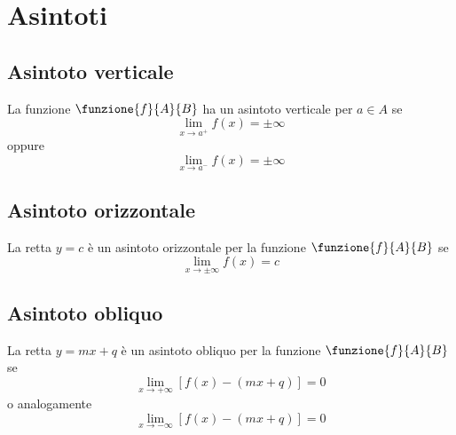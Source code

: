 \chapter{Asintoti}
\section{Asintoto verticale}
La funzione $\funzione{f}{A}{B}$ ha un asintoto verticale per $a\in A$ se
\begin{equation}
\lim_{x\to a^+} f(x)=\pm\infty
\end{equation}
oppure
\begin{equation}
\lim_{x\to a^-} f(x)=\pm\infty
\end{equation}
\section{Asintoto orizzontale}
La retta $y=c$ è un asintoto orizzontale per la funzione  $\funzione{f}{A}{B}$  se \begin{equation}
\lim_{x\to\pm\infty} f(x)=c
\end{equation}
\section{Asintoto obliquo}
La retta $y=mx+q$ è un asintoto obliquo per la funzione  $\funzione{f}{A}{B}$ se
\begin{equation}
\lim_{x\to +\infty} [f(x)-(mx+q)]=0
\end{equation}
o analogamente
\begin{equation}
\lim_{x\to -\infty} [f(x)-(mx+q)]=0
\end{equation}